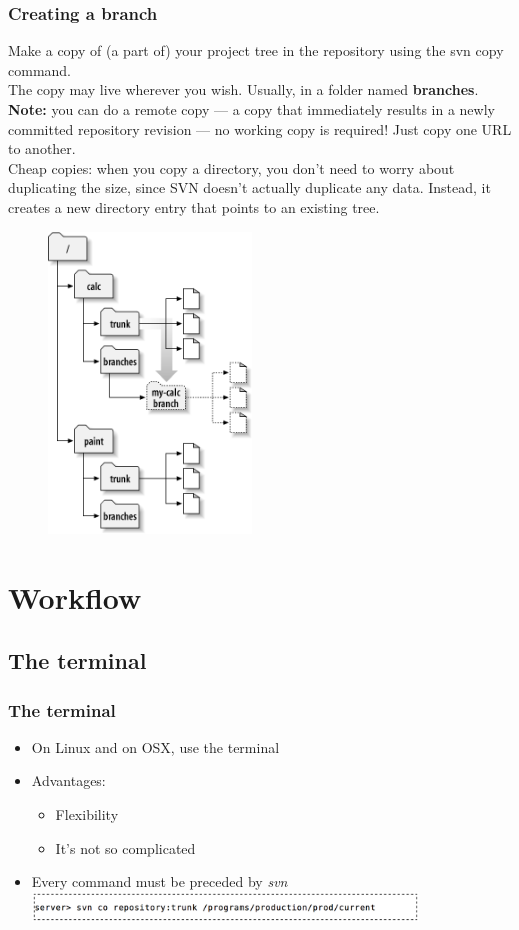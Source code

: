 \documentclass{beamer}
\begin{document}
\frame
{
	\frametitle{Creating a branch}
	Make a copy of (a part of) your project tree in the repository using the \alert{svn copy} command. \\
	\medskip
	The copy may live wherever you wish. Usually, in a folder named \textbf{branches}.\\
	\medskip
	\textbf{Note:} you can do a \alert{remote copy} --- a copy that immediately results in a newly committed repository revision --- no working copy is required! 	Just copy one URL to another.\\
	\medskip
	\alert{Cheap copies:} when you copy a directory, you don't need to worry about duplicating the size, since SVN doesn't actually duplicate any data. Instead, it creates a new directory entry that points to an existing tree.



}

\frame
{
	\begin{figure}[H]
	\centering
	\includegraphics[height=8cm]{branches2.png}
	\end{figure}


}

\section{Workflow}


\subsection{The terminal}

\frame
{
  \frametitle{The terminal}
  
  \begin{itemize}
  \item<1-> On Linux and on OSX, use the terminal
  \item<2-> Advantages:
  	\begin{itemize}
	\item<1-> Flexibility
	\item<2-> It's not so complicated
	\end{itemize}
  \item<3-> Every command must be preceded by \textit{svn}
  \includegraphics[height=0.8cm]{svn_example.png}
  \end{itemize}
	
}
\end{document}
